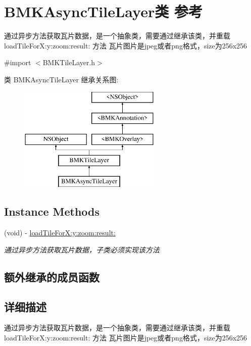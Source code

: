 \hypertarget{interface_b_m_k_async_tile_layer}{}\section{B\+M\+K\+Async\+Tile\+Layer类 参考}
\label{interface_b_m_k_async_tile_layer}


通过异步方法获取瓦片数据，是一个抽象类，需要通过继承该类，并重载 load\+Tile\+For\+X\+:y\+:zoom\+:result\+: 方法 瓦片图片是jpeg或者png格式，size为256x256  




{\ttfamily \#import $<$B\+M\+K\+Tile\+Layer.\+h$>$}

类 B\+M\+K\+Async\+Tile\+Layer 继承关系图\+:\begin{figure}[H]
\begin{center}
\leavevmode
\includegraphics[height=5.000000cm]{interface_b_m_k_async_tile_layer}
\end{center}
\end{figure}
\subsection*{Instance Methods}
\begin{DoxyCompactItemize}
\item 
(void) -\/ \hyperlink{interface_b_m_k_async_tile_layer_afd695e6c960b6c13baeb19146c26b5c0}{load\+Tile\+For\+X\+:y\+:zoom\+:result\+:}
\begin{DoxyCompactList}\small\item\em 通过异步方法获取瓦片数据，子类必须实现该方法 \end{DoxyCompactList}\end{DoxyCompactItemize}
\subsection*{额外继承的成员函数}


\subsection{详细描述}
通过异步方法获取瓦片数据，是一个抽象类，需要通过继承该类，并重载 load\+Tile\+For\+X\+:y\+:zoom\+:result\+: 方法 瓦片图片是jpeg或者png格式，size为256x256 

